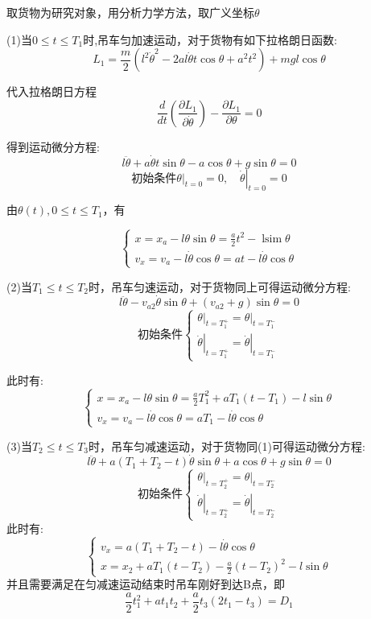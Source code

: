\documentclass[withoutpreface,bwprint]{cumcmthesis} %
\begin{document}
取货物为研究对象，用分析力学方法，取广义坐标$\theta$

(1)当$0 \leq t \leq T_1$时,吊车匀加速运动，对于货物有如下拉格朗日函数:
$$L_{1}=\frac{m}{2}\left(l^{2} \dot{\theta}^{2}-2 a l \dot{\theta} t \cos \theta+a^{2} t^{2}\right)+m gl\cos \theta$$

代入拉格朗日方程$$\frac{d}{d t}\left(\frac{\partial L_{1}}{\partial \dot{\theta}}\right)-\frac{\partial L_1}{\partial \theta}=0$$

得到运动微分方程:$$l \ddot{\theta}+a \dot{\theta} t \sin \theta-a \cos \theta+g \sin \theta=0$$
$$\text{初始条件}\left.\theta\right|_{t=0}=0,\left.\quad \dot{\theta}\right|_{t=0}=0$$

由$\theta(t),0 \leqslant t \leqslant T_{1}$，有

$$\left\{\begin{array}{l}
        x=x_{a}-l \theta \sin \theta=\frac{a}{2} t^{2}-\operatorname{lsim} \theta \\
        v_{x}=v_{a}-l \dot{\theta} \cos \theta=a t-l \dot{\theta} \cos \theta
    \end{array}\right.$$

(2)当$T_1 \leq t \leq T_2$时，吊车匀速运动，对于货物同上可得运动微分方程:
$$l\ddot{\theta}-v_{a2}\dot{\theta}\sin\theta+(v_{a2}+g) \sin \theta=0$$
$$\text{初始条件}\left \{\begin{array}{l}
        \left.\theta\right|_{t=T_{1}^{+}}=\left.\theta\right|_{t=T_{1}^{-}} \\
        \left.\dot{\theta}\right|_{t=T_{1}^{+}}=\left.\dot{\theta}\right|_{t=T_{1}^{-}}
    \end{array}\right.$$

此时有:$$\left\{\begin{array}{l}
        x=x_{a}-l\theta \sin \theta=\frac{a}{2} T_{1}^{2}+aT_1(t-T_1)-l\sin \theta \\
        v_{x}=v_{a}-l \dot{\theta} \cos \theta=a T_{1}-l\dot{\theta }\cos \theta
    \end{array}\right.$$

(3)当$T_2 \leq t \leq T_3$时，吊车匀减速运动，对于货物同(1)可得运动微分方程:
$$l \ddot{\theta}+a\left(T_{1}+T_{2}-t\right) \dot{\theta} \sin \theta+a \cos \theta+g \sin \theta=0$$
$$\text{初始条件}\left \{\begin{array}{l}
        \left.\theta\right|_{t=T_{2}^{+}}=\left.\theta\right|_{t=T_{2}^{-}} \\
        \left.\dot{\theta}\right|_{t=T_{2}^{+}}=\left.\dot{\theta}\right|_{t=T_{2}^{-}}
    \end{array}\right.$$
此时有:$$\left\{\begin{array}{l}
        v_{x}=a\left(T_{1}+T_{2}-t\right)-l \dot{ \theta} \cos \theta \\
        x=x_{2}+aT_{1}(t-T_{2})-\frac{a}{2}(t-T_{2})^{2}-l\sin\theta
    \end{array}\right.$$
并且需要满足在匀减速运动结束时吊车刚好到达B点，即$$\frac{a}{2}t_1^2+at_1t_2+\frac{a}{2}t_3(2t_1-t_3)=D_1$$
\end{document}
